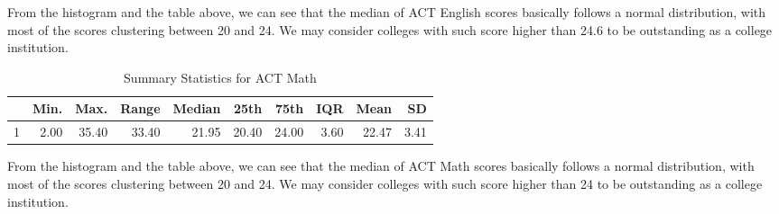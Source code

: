 \documentclass{article}\usepackage[]{graphicx}\usepackage[]{color}
\makeatletter
\newenvironment{kframe}{%
 \def\at@end@of@kframe{}%
 \ifinner\ifhmode%
  \def\at@end@of@kframe{\end{minipage}}%
  \begin{minipage}{\columnwidth}%
 \fi\fi%
 \def\FrameCommand##1{\hskip\@totalleftmargin \hskip-\fboxsep
 \colorbox{shadecolor}{##1}\hskip-\fboxsep
     \hskip-\linewidth \hskip-\@totalleftmargin \hskip\columnwidth}%
 \MakeFramed {\advance\hsize-\width
   \@totalleftmargin\z@ \linewidth\hsize
   \@setminipage}}%
 {\par\unskip\endMakeFramed%
 \at@end@of@kframe}
\makeatother
\begin{document}
From the histogram and the table above, we can see that the median of ACT English scores basically follows a normal distribution, with most of the scores clustering between 20 and 24. We may consider colleges with such score higher than 24.6 to be outstanding as a college institution.

\begin{kframe}


{\ttfamily\noindent\bfseries\color{errorcolor}{\#\# Error: 'include\_graphics' is not an exported object from 'namespace:knitr'}}\end{kframe}\begin{table}[ht]
\centering
\begin{tabular}{rrrrrrrrrr}
  \hline
 & Min. & Max. & Range & Median & 25th & 75th & IQR & Mean & SD \\ 
  \hline
1 & 2.00 & 35.40 & 33.40 & 21.95 & 20.40 & 24.00 & 3.60 & 22.47 & 3.41 \\ 
   \hline
\end{tabular}
\caption{Summary Statistics for ACT Math} 
\end{table}


From the histogram and the table above, we can see that the median of ACT Math scores basically follows a normal distribution, with most of the scores clustering between 20 and 24. We may consider colleges with such score higher than 24 to be outstanding as a college institution.
\end{document}
